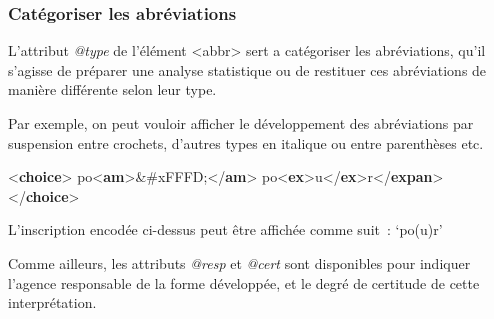 \documentclass[]{beamer}\makeatletter
\begin{document}
\begin{frame}[fragile]
\frametitle{Catégoriser les abréviations}\par
L’attribut \emph{@type} de l’élément {\color{blue2}<abbr>} sert a      catégoriser les abréviations, qu’il s’agisse de préparer une analyse      statistique ou de restituer ces abréviations de manière différente      selon leur type. \par
Par exemple, on peut vouloir afficher le développement des      abréviations par suspension entre crochets, d’autres types en italique      ou entre parenthèses etc. 
\bgroup\ttfamily\fontsize{8.5pt}{9pt}\selectfont\par
\begin{exampleblock}{}
\noindent\ttfamily\mbox{}{\color{blue1}<\textbf{choice}>}\mbox{}\newline 
{}po{\color{blue1}<\textbf{am}>}&#xFFFD;{\color{blue1}</\textbf{am}>}\mbox{}\newline 
{}\mbox{}\newline 
{}po{\color{blue1}<\textbf{ex}>}u{\color{blue1}</\textbf{ex}>}r{\color{blue1}</\textbf{expan}>}\mbox{}\newline 
{\color{blue1}</\textbf{choice}>}
\end{exampleblock}
\par\egroup
   L'inscription encodée ci-dessus peut être affichée comme      suit : ‘po(u)r’     \par
Comme ailleurs, les attributs \emph{@resp} et       \emph{@cert} sont disponibles pour indiquer l'agence      responsable de la forme développée, et le degré de certitude de cette      interprétation.
\end{frame}
\end{document}

